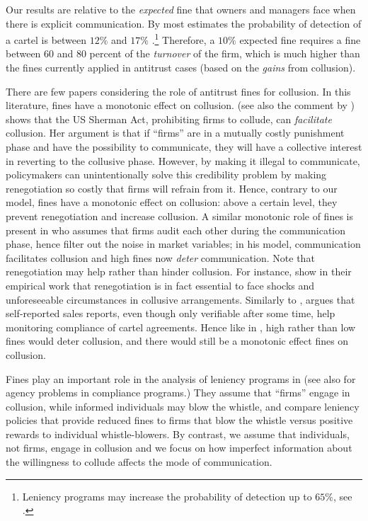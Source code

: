 \documentclass[]{article}
\begin{document}
Our results are relative to the \textit{expected} fine that owners and managers face when there is explicit communication. By most estimates the probability of detection of a cartel is between $12\%$ and $17\%$ \citep{bryant1991,combe2011fines,harringtonjr2009,park2018}.\footnote{%
Leniency programs may increase the probability of detection up to $65\%$, see \cite{miller2009}.} Therefore, a $10\%$  expected fine requires a fine between $60$ and $80$ percent of the \textit{turnover} of the firm, which is much higher than the fines currently applied in antitrust cases (based on the \textit{gains} from collusion). 

There are few papers considering the role of antitrust fines for collusion. In this literature, fines have a monotonic effect on collusion.  \cite{Mccutcheon1997} (see also the comment by \citealt{Andersson2008}) shows that the US Sherman Act, prohibiting firms to collude, can \emph{facilitate} collusion. Her argument is that if ``firms'' are in a mutually costly punishment phase and have the possibility to communicate, they will have a collective interest in reverting to the collusive phase. However, by making it illegal to communicate, policymakers can unintentionally solve this credibility problem by making renegotiation so costly that firms will refrain from it. Hence, contrary to our model, fines have a monotonic effect on collusion: above a certain level, they prevent renegotiation and increase collusion. A similar monotonic role of fines is present in \cite{mouraviev2013} who assumes that firms audit each other during the communication phase, hence filter out the noise in market variables; in his model, communication facilitates collusion and high fines now \textit{deter} communication. Note that renegotiation may help rather than hinder collusion. For instance, \cite{Genesove2001} show in their empirical work that renegotiation is in fact essential to face shocks and unforeseeable circumstances in collusive arrangements. Similarly to \cite{Genesove2001}, \cite{Spector:2015wx} argues that self-reported sales reports, even though only verifiable after some time, help monitoring compliance of cartel agreements. Hence like in \cite{mouraviev2013}, high rather than low fines would deter collusion, and there would still be a monotonic effect fines on collusion.

Fines play an important role in the analysis of leniency programs in \cite*{Aubert2008} (see also \citealp{Angelucci2019} for agency problems in compliance programs.) They assume that ``firms'' engage in collusion, while informed individuals  may blow the whistle, and compare leniency policies that provide reduced fines to firms that blow the whistle versus positive rewards to individual whistle-blowers. By contrast, we assume that individuals, not firms, engage in collusion and we focus on how imperfect information about the willingness to collude affects the mode of communication.
\end{document}

